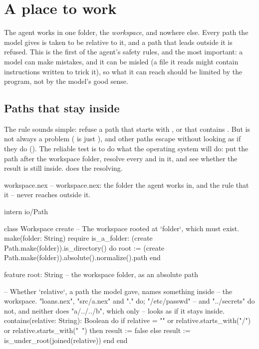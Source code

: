 \chapter{A place to work}\label{ch:workspace}

The agent works in one folder, the \emph{workspace}, and nowhere else.
Every path the model gives is taken to be relative to it, and a path that
leads outside it is refused. This is the first of the agent's safety rules,
and the most important: a model can make mistakes, and it can be misled
(a file it reads might contain instructions written to trick it), so what
it can reach should be limited by the program, not by the model's good
sense.

\section{Paths that stay inside}

The rule sounds simple: refuse a path that starts with \code{/}, or that
contains . But  is not always a problem
( is just ), and other paths escape
without looking as if they do (). The reliable test is
to do what the operating system will do: put the path after the workspace
folder, resolve every  and  in it, and see whether the
result is still inside.  does the resolving.

\begin{newfile}{workspace.nex}
-- workspace.nex: the folder the agent works in, and the rule that it
-- never reaches outside it.

intern io/Path

class Workspace
create
  -- The workspace rooted at `folder`, which must exist.
  make(folder: String)
  require
    is_a_folder: (create Path.make(folder)).is_directory()
  do
    root := (create Path.make(folder)).absolute().normalize().path
  end

feature
  root: String    -- the workspace folder, as an absolute path

  -- Whether `relative`, a path the model gave, names something inside
  -- the workspace. "loans.nex", "src/a.nex" and "." do; "/etc/passwd"
  -- and "../secrets" do not, and neither does "a/../../b", which only
  -- looks as if it stays inside.
  contains(relative: String): Boolean do
    if relative = "" or relative.starts_with("/") or relative.starts_with("~") then
      result := false
    else
      result := is_under_root(joined(relative))
    end
  end
\end{newfile}

